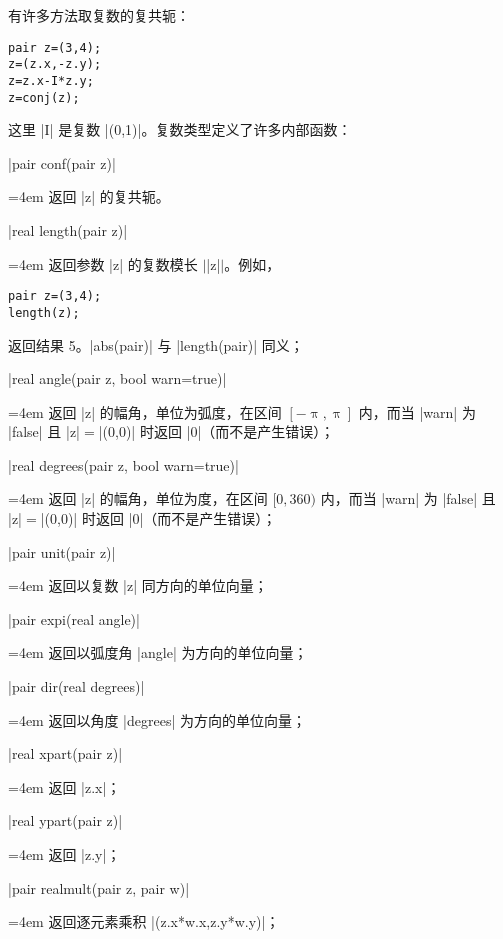 \documentclass[nofonts,CJKnormalspaces]{ctexbook}[2009/05/20]
\makeatletter
\newenvironment{funclist}{\trivlist
  \parindent=0pt
\item[]
  \def\item{\medskip\par\leftskip=0pt}
  \def\go{\par\leftskip=4em}}
{\endtrivlist}
\newenvironment{typelist}{\itemize
  \let\old@item\@item
  \def\@item[##1]{\expandafter\old@item[\ttfamily\color{type!50!black}##1]}}
{\enditemize}
\makeatother
\begin{document}
\begin{typelist}
有许多方法取复数的复共轭：
\begin{lstlisting}
pair z=(3,4);
z=(z.x,-z.y);
z=z.x-I*z.y;
z=conj(z);
\end{lstlisting}
这里 |I| 是复数 |(0,1)|。复数类型定义了许多内部函数：
\begin{funclist}
\item |pair conf(pair z)| \go
  返回 |z| 的复共轭。

\item |real length(pair z)| \go
  返回参数 |z| 的复数模长 $\vert$|z|$\vert$。例如，
\begin{lstlisting}
pair z=(3,4);
length(z);
\end{lstlisting}
  返回结果 5。|abs(pair)| 与 |length(pair)| 同义；

\item |real angle(pair z, bool warn=true)| \go
  返回 |z| 的幅角，单位为弧度，在区间 $[-\uppi, \uppi]$ 内，而当 |warn| 为
  |false| 且 |z|${}={}$|(0,0)| 时返回 |0|（而不是产生错误）；

\item |real degrees(pair z, bool warn=true)| \go
  返回 |z| 的幅角，单位为度，在区间 $[0,360)$ 内，而当 |warn| 为 |false| 且
  |z|${}={}$|(0,0)| 时返回 |0|（而不是产生错误）；

\item |pair unit(pair z)| \go
  返回以复数 |z| 同方向的单位向量；

\item |pair expi(real angle)| \go
  返回以弧度角 |angle| 为方向的单位向量；

\item |pair dir(real degrees)| \go
  返回以角度 |degrees| 为方向的单位向量；

\item |real xpart(pair z)| \go
  返回 |z.x|；

\item |real ypart(pair z)| \go
  返回 |z.y|；

\item |pair realmult(pair z, pair w)| \go
  返回逐元素乘积 |(z.x*w.x,z.y*w.y)|；


\end{funclist}
\end{typelist}
\end{document}
